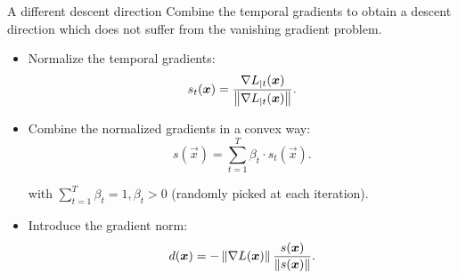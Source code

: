 \begin{frame}{A different descent direction}
	Combine the temporal gradients to obtain a descent direction which does not suffer from the vanishing gradient problem.
\begin{itemize}
	\item Normalize the temporal gradients:
	\begin{equation}
	s_t(\boldsymbol{x}) = \frac{\nabla L_{|t}(\boldsymbol{x})}{\left\Vert \nabla L_{|t}(\boldsymbol{x}) \right\Vert}.
	\end{equation}
	
	\item Combine the normalized gradients in a convex way:
	\begin{equation}
	s(\vec{x}) = \sum_{t=1}^T \beta_t \cdot s_t(\vec{x}).
	\end{equation}
	
	with $\sum_{t=1}^T\beta_t=1, \beta_t>0$ (randomly picked at each iteration).
	\item Introduce the gradient norm:
	\begin{equation}
	d(\boldsymbol{x}) = - \left\Vert \nabla L (\boldsymbol{x}) \right\Vert\frac{s(\boldsymbol{x})}{\left\Vert s(\boldsymbol{x}) \right\Vert}.
	\end{equation}
\end{itemize}
\end{frame}

